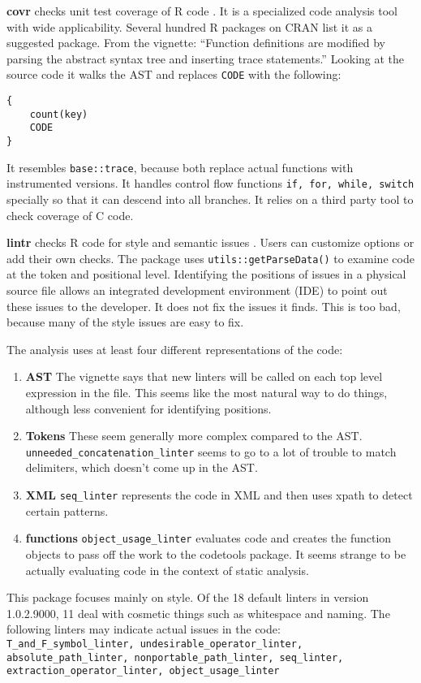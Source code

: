 \textbf{covr} checks unit test coverage of R code \cite{R-covr}. It is a specialized code
analysis tool with wide applicability. Several hundred R packages on CRAN
list it as a suggested package. From the vignette: ``Function definitions
are modified by parsing the abstract syntax tree and inserting trace
statements.'' Looking at the source code it walks the AST and replaces
\texttt{CODE} with the following:

\begin{lstlisting}
{
    count(key)
    CODE
}
\end{lstlisting}

It resembles \texttt{base::trace}, because both replace actual functions
with instrumented versions. It handles control flow functions \texttt{if,
for, while, switch} specially so that it can descend into all branches. It
relies on a third party tool to check coverage of C code.

\textbf{lintr} checks R code for style and semantic issues \cite{R-lintr}.
Users can customize options or add their own checks. The package uses
\texttt{utils::getParseData()} to examine code at the token and positional
level. Identifying the positions of issues in a physical source file allows
an integrated development environment (IDE) to point out these issues to
the developer. It does not fix the issues it finds. This is too bad,
because many of the style issues are easy to fix.

The analysis uses at least four different
representations of the code:

\begin{enumerate}

    \item \textbf{AST} The vignette says that new linters will be called on
        each top level expression in the file. This seems like the most
        natural way to do things, although less convenient for identifying
        positions.
    \item \textbf{Tokens} These seem generally more complex
        compared to the AST. \texttt{unneeded\_concatenation\_linter}
        seems to go to a lot of trouble to match delimiters, which doesn't
        come up in the AST.
    \item \textbf{XML} \texttt{seq\_linter} represents
        the code in XML and then uses xpath to detect certain patterns.
    \item \textbf{functions} \texttt{object\_usage\_linter} evaluates
        code and creates the function objects to pass off the work to
        the codetools package. It seems strange to be actually evaluating
        code in the context of static analysis.

\end{enumerate}

This package focuses mainly on style. Of the 18 default linters in version
1.0.2.9000, 11 deal with cosmetic things such as whitespace and naming.
The following linters may indicate actual issues in the code:
\texttt{
T\_and\_F\_symbol\_linter,
undesirable\_operator\_linter,
absolute\_path\_linter,
nonportable\_path\_linter,
seq\_linter,
extraction\_operator\_linter,
object\_usage\_linter
}
